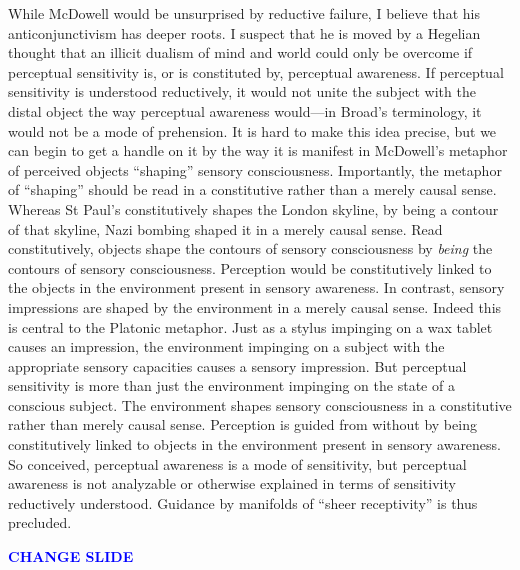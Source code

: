 \documentclass[12pt]{article}
\newcommand{\change}{\textcolor{blue}{\textbf{CHANGE SLIDE}}}
\begin{document}
While McDowell would be unsurprised by reductive failure, I believe that his anticonjunctivism has deeper roots. I suspect that he is moved by a Hegelian thought that an illicit dualism of mind and world could only be overcome if perceptual sensitivity is, or is constituted by, perceptual awareness. If perceptual sensitivity is understood reductively, it would not unite the subject with the distal object the way perceptual awareness would---in Broad's terminology, it would not be a mode of prehension. It is hard to make this idea precise, but we can begin to get a handle on it by the way it is manifest in McDowell's metaphor of perceived objects ``shaping'' sensory consciousness. Importantly, the metaphor of ``shaping'' should be read in a constitutive rather than a merely causal sense. Whereas St Paul's constitutively shapes the London skyline, by being a contour of that skyline, Nazi bombing shaped it in a merely causal sense. Read constitutively, objects shape the contours of sensory consciousness by \emph{being} the contours of sensory consciousness. Perception would be constitutively linked to the objects in the environment present in sensory awareness. In contrast, sensory impressions are shaped by the environment in a merely causal sense. Indeed this is central to the Platonic metaphor. Just as a stylus impinging on a wax tablet causes an impression, the environment impinging on a subject with the appropriate sensory capacities causes a sensory impression. But perceptual sensitivity is more than just the environment impinging on the state of a conscious subject. The environment shapes sensory consciousness in a constitutive rather than merely causal sense. Perception is guided from without by being constitutively linked to objects in the environment present in sensory awareness. So conceived, perceptual awareness is a mode of sensitivity, but perceptual awareness is not analyzable or otherwise explained in terms of sensitivity reductively understood. Guidance by manifolds of ``sheer receptivity'' is thus precluded.

\change
\end{document}
